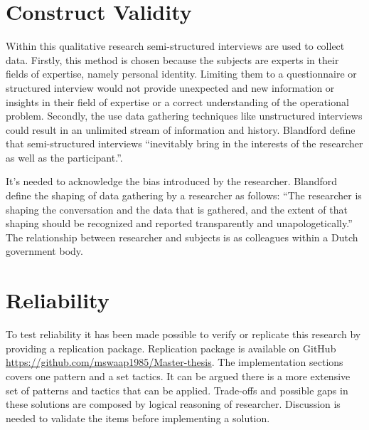 \section{Construct Validity}
Within this qualitative research semi-structured interviews are used to collect data. Firstly, this method is chosen because the subjects are experts in their fields of expertise, namely personal identity. Limiting them to a questionnaire or structured interview would not provide unexpected and new information or insights in their field of expertise or a correct understanding of the operational problem. Secondly, the use data gathering techniques like unstructured interviews could result in an unlimited stream of information and history. Blandford \etal \cite{Blandford2016QualitativeHR} define that semi-structured interviews “inevitably bring in the interests of the researcher as well as the participant.”. 
\par
It’s needed to acknowledge the bias introduced by the researcher. Blandford \etal \cite{Blandford2016QualitativeHR} define the shaping of data gathering by a researcher as follows: “The researcher is shaping the conversation and the data that is gathered, and the extent of that shaping should be recognized and reported transparently and unapologetically.” The relationship between researcher and subjects is as colleagues within a Dutch government body.

\section{Reliability}
To test reliability it has been made possible to verify or replicate this research by providing a replication package. Replication package is available on GitHub \url{https://github.com/mswaap1985/Master-thesis}.
The implementation sections covers one pattern and a set tactics. It can be argued there is a more extensive set of patterns and tactics that can be applied.
Trade-offs and possible gaps in these solutions are composed by logical reasoning of researcher. Discussion is needed to validate the items before implementing a solution. 